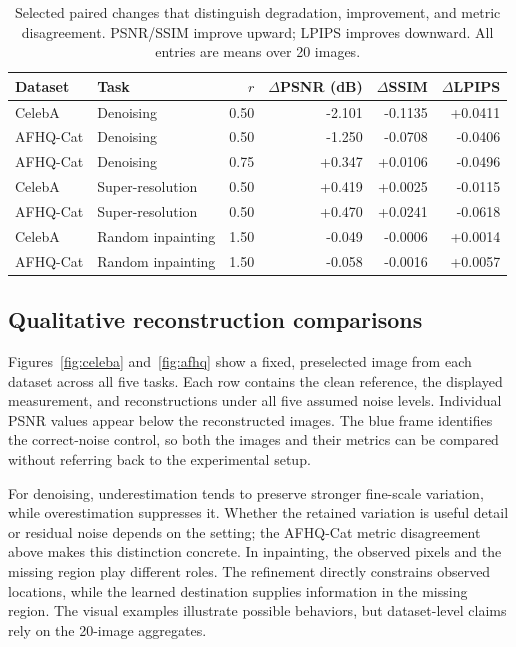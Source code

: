 \documentclass[10pt,letterpaper]{article}
\begin{document}
\begin{table}[H]\centering\small
\caption{Selected paired changes that distinguish degradation, improvement, and metric disagreement. PSNR/SSIM improve upward; LPIPS improves downward. All entries are means over 20 images.}
\label{tab:highlights}
\begin{tabular}{llrrrr}
\toprule
Dataset & Task & $r$ & $\Delta$PSNR (dB) & $\Delta$SSIM & $\Delta$LPIPS\\
\midrule
CelebA & Denoising & 0.50 & -2.101 & -0.1135 & +0.0411\\
AFHQ-Cat & Denoising & 0.50 & -1.250 & -0.0708 & -0.0406\\
AFHQ-Cat & Denoising & 0.75 & +0.347 & +0.0106 & -0.0496\\
CelebA & Super-resolution & 0.50 & +0.419 & +0.0025 & -0.0115\\
AFHQ-Cat & Super-resolution & 0.50 & +0.470 & +0.0241 & -0.0618\\
CelebA & Random inpainting & 1.50 & -0.049 & -0.0006 & +0.0014\\
AFHQ-Cat & Random inpainting & 1.50 & -0.058 & -0.0016 & +0.0057\\
\bottomrule
\end{tabular}
\end{table}

\subsection{Qualitative reconstruction comparisons}
Figures~\ref{fig:celeba} and~\ref{fig:afhq} show a fixed, preselected image from each dataset across all five tasks. Each row contains the clean reference, the displayed measurement, and reconstructions under all five assumed noise levels. Individual PSNR values appear below the reconstructed images. The blue frame identifies the correct-noise control, so both the images and their metrics can be compared without referring back to the experimental setup.

For denoising, underestimation tends to preserve stronger fine-scale variation, while overestimation suppresses it. Whether the retained variation is useful detail or residual noise depends on the setting; the AFHQ-Cat metric disagreement above makes this distinction concrete. In inpainting, the observed pixels and the missing region play different roles. The refinement directly constrains observed locations, while the learned destination supplies information in the missing region. The visual examples illustrate possible behaviors, but dataset-level claims rely on the 20-image aggregates.
\end{document}

